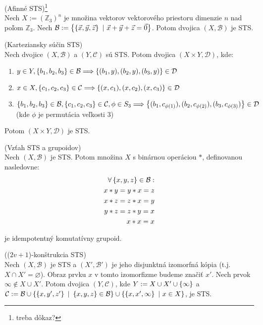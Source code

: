 \begin{theorem}{(Afinné STS)\footnote{\TODO treba dôkaz?}}\\
Nech $X := \left(\mathbb{Z}_3\right)^{n}$ je množina vektorov vektorového priestoru dimenzie $n$ nad poľom $\mathbb{Z}_3$. 
Nech $\mathcal{B} := \left\{\left\{\vec{x}, \vec{y}, \vec{z}\right\} ~|~ \vec{x} + \vec{y} + \vec{z} = \vec{0}\right\}$. Potom 
dvojica $(X, \mathcal{B})$ je STS.
\end{theorem}

\begin{theorem}{(Karteziansky súčin STS)}\\
Nech dvojice $(X, \mathcal{B})$ a $(Y, \mathcal{C})$ sú STS. Potom dvojica $(X \times Y, \mathcal{D})$, kde:
\begin{enumerate}
    \item $y \in Y, \left\{b_1, b_2, b_3\right\} \in \mathcal{B} \Longrightarrow \left\{(b_1, y), (b_2, y), (b_3, y)\right\} \in \mathcal{D}$
    \item $x \in X, \left\{c_1, c_2, c_3\right\} \in \mathcal{C} \Longrightarrow \left\{(x, c_1), (x, c_2), (x, c_3)\right\} \in \mathcal{D}$
    \item $\left\{b_1, b_2, b_3\right\} \in \mathcal{B}, \left\{c_1, c_2, c_3\right\} \in \mathcal{C}, \phi \in S_3 \Longrightarrow 
            \left\{(b_1, c_{\phi(1)}), (b_2, c_{\phi(2)}), (b_3, c_{\phi(3)})\right\} \in \mathcal{D}$ (kde $\phi$ je permutácia veľkosti $3$) 
\end{enumerate}

Potom $(X \times Y, \mathcal{D})$ je STS.
\end{theorem}


\begin{theorem}{(Vzťah STS a grupoidov)}\\
Nech $(X, \mathcal{B})$ je STS. Potom množina $X$ s binárnou operáciou $\ast$, definovanou nasledovne:
\begin{align*}
    \forall \left\{x,y,z\right\} \in \mathcal{B}:\\
    x\ast y = y \ast x = z\\ 
    x \ast z = z \ast x = y\\ 
    y\ast z = z \ast y = x\\
    x \ast x = x
\end{align*}

je idempotentný komutatívny grupoid. 
\end{theorem}


\begin{theorem}{(($2v +1$)-konštrukcia STS)}\\
Nech $(X, \mathcal{B})$ je STS a $(X', \mathcal{B}')$ je jeho disjunktná izomorfná kópia (t.j. $X \cap  X' = \varnothing$). Obraz prvku $x$ v tomto izomorfizme budeme značiť $x'$. 
Nech prvok $\infty \notin X \cup X'$.
Potom dvojica $(Y, \mathcal{C})$, kde $Y := X \cup X' \cup \left\{\infty\right\}$ a $\mathcal{C} := \mathcal{B} 
\cup \left\{\left\{x, y', z'\right\} ~|~ \left\{x,y,z\right\}\in \mathcal{B}\right\} 
\cup \left\{\left\{x, x', \infty\right\} ~|~ x \in X\right\}$, je STS.    
\end{theorem}

